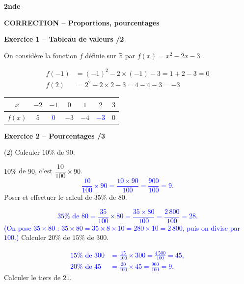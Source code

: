\documentclass[10pt,a4paper]{article}
\renewcommand{\niveau}{2nde}
\renewcommand{\chapitre}{Proportions, pourcentages}
\renewcommand{\interroversion}[1]{
    \noindent\textbf{\niveau}

    \vspace{-0.5cm}
    \begin{center}
        \textbf{\large CORRECTION -- \chapitre}
    \end{center}

    \vspace{0.1cm}
}
\begin{document}
\footnotesize


\begin{sujets}

\interroversion{A}

\textbf{Exercice 1 -- Tableau de valeurs \hfill /2}

On considère la fonction \(f\) définie sur \(\mathbb{R}\) par \(f(x)=x^2-2x-3\).

\[
\begin{aligned}
f(-1) &= (-1)^2-2\times(-1)-3 = 1+2-3 = 0\\
f(2)  &= 2^2-2\times 2-3 = 4-4-3 = -3
\end{aligned}
\]

\begin{center}
    \renewcommand{\arraystretch}{1.5}
    \setlength{\tabcolsep}{0.25cm}
    \begin{tabular}{|*{7}{c|}}
    \hline
    \(x\) & \(-2\) & \(-1\) & \(0\) & \(1\) & \(2\) & \(3\) \\
    \hline
    \(f(x)\) & \(5\) & \textcolor{blue}{\(0\)} & \(-3\) & \(-4\) & \textcolor{blue}{\(-3\)} & \(0\) \\
    \hline
    \end{tabular}
\end{center}

\textbf{Exercice 2 -- Pourcentages \hfill /3}

\begin{tasks}(2)
    \task Calculer \(10\%\) de \(90\).

    \(10\%\) de \(90\), c'est \(\dfrac{10}{100}\times 90\). \textcolor{blue}{
    \[
    \frac{10}{100}\times 90 = \frac{10\times 90}{100} = \frac{900}{100} = 9.
    \]}
    \task Poser et effectuer le calcul de \(35\%\) de \(80\).

    \textcolor{blue}{
    \[
    35\%\text{ de }80 = \frac{35}{100}\times 80 = \frac{35\times 80}{100} = \frac{2\,800}{100} = 28.
    \]
    (On pose \(35\times80\) : \(35\times80=35\times8\times10=280\times10=2\,800\), puis on divise par \(100\).)}
    \task Calculer \(20\%\) de \(15\%\) de \(300\).

    \textcolor{blue}{
    \[
    \begin{aligned}
    15\%\text{ de }300 &=\frac{15}{100}\times300=\frac{4\,500}{100}=45,\\
    20\%\text{ de }45 &=\frac{20}{100}\times45=\frac{900}{100}=9.
    \end{aligned}
    \]}
    \task Calculer le tiers de \(21\).


\end{tasks}
\end{sujets}
\end{document}
